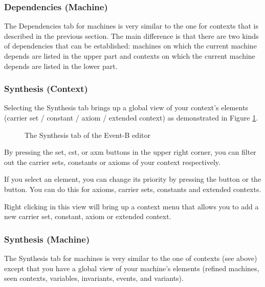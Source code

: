 \subsubsection{Dependencies (Machine)}

The \textsf{Dependencies} tab for machines is very similar to the one for contexts that is described in the previous section. The main difference is that there are two kinds of dependencies that can be established: machines on which the current machine depends are listed in the upper part and contexts on which the current machine depends are listed in the lower part.

\subsubsection{Synthesis (Context)}

Selecting the \textsf{Synthesis} tab brings up a global view of your context's elements (carrier set / constant / axiom / extended context) as demonstrated in Figure \ref{fig_ref_01_eventb_editor11}. 

\begin{figure}[!ht]
\begin{center}
	\caption{The Synthesis tab of the Event-B editor}
	\label{fig_ref_01_eventb_editor11}
\end{center}
\end{figure}

By pressing the \textsf{set}, \textsf{cst}, or \textsf{axm} buttons in the upper right corner, you can filter out the carrier sets, constants or axioms of your context respectively.

If you select an element, you can change its priority by pressing the  button or the  button. You can do this for axioms, carrier sets, constants and extended contexts.

Right clicking in this view will bring up a context menu that allows you to add a new carrier set, constant, axiom or extended context. 

\subsubsection{Synthesis (Machine)}

The \textsf{Synthesis} tab for machines is very similar to the one of contexts (see above) except that you have a global view of your machine's elements (refined machines, seen contexts, variables, invariants, events, and variants).


